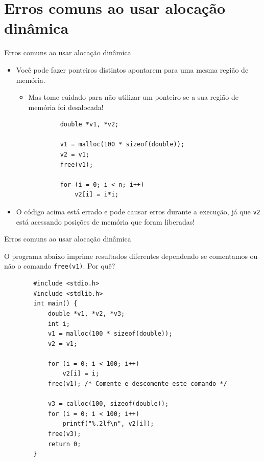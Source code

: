 \documentclass[handout]{beamer}
\newcommand{\cod}[1]{\texttt{#1}}
\begin{document}
\section{Erros comuns ao usar alocação dinâmica}

\begin{frame}[fragile]{Erros comuns ao usar alocação dinâmica}

    \begin{itemize}
        \item Você pode fazer ponteiros distintos apontarem para uma mesma região de memória.
        \begin{itemize}
            \item Mas tome cuidado para não utilizar um ponteiro se a sua região de memória foi desalocada!
        \end{itemize}

        \begin{verbatim}
            double *v1, *v2;
            
            v1 = malloc(100 * sizeof(double));
            v2 = v1;
            free(v1);

            for (i = 0; i < n; i++)
                v2[i] = i*i;
        \end{verbatim}

        \item O código acima está errado e pode causar erros durante a execução, já que \cod{v2} está acessando posições de memória que foram liberadas!
    \end{itemize}

\end{frame}

\begin{frame}[fragile]{Erros comuns ao usar alocação dinâmica}

    O programa abaixo imprime resultados diferentes dependendo se comentamos ou não o comando \cod{free(v1)}. Por quê?
    \vspace{-0.3cm}
    \begin{verbatim}
        #include <stdio.h>
        #include <stdlib.h>
        int main() {
            double *v1, *v2, *v3;
            int i;
            v1 = malloc(100 * sizeof(double));
            v2 = v1;

            for (i = 0; i < 100; i++)
                v2[i] = i;
            free(v1); /* Comente e descomente este comando */

            v3 = calloc(100, sizeof(double));
            for (i = 0; i < 100; i++)
                printf("%.2lf\n", v2[i]);
            free(v3);
            return 0;
        }
    \end{verbatim}

\end{frame}
\end{document}
